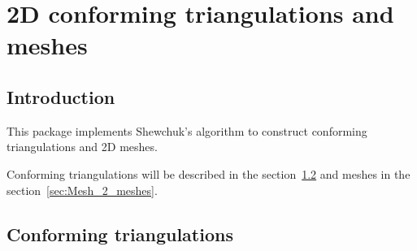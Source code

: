 \chapter{2D conforming triangulations and meshes}
\label{user_chapter_2D_Meshes}

\minitoc

\section{Introduction}
\label{sec:Mesh_2_introduction}

This package implements Shewchuk's algorithm to construct conforming
triangulations and 2D meshes.

Conforming triangulations will be described in the
section~\ref{sec:Mesh_2_conforming_triangulation} and meshes in the
section~\ref{sec:Mesh_2_meshes}.






\section{Conforming triangulations}
\label{sec:Mesh_2_conforming_triangulation}

